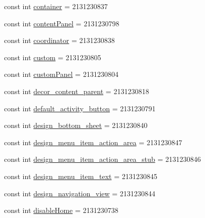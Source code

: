 \begin{DoxyCompactItemize}
const int \mbox{\hyperlink{class_f_w_p_s___app_1_1_droid_1_1_resource_1_1_id_a284b0cbba132e4f7505b5a28f7ec0555}{container}} = 2131230837
\item 
const int \mbox{\hyperlink{class_f_w_p_s___app_1_1_droid_1_1_resource_1_1_id_ab13653273251d59090e949d0c390664e}{content\+Panel}} = 2131230798
\item 
const int \mbox{\hyperlink{class_f_w_p_s___app_1_1_droid_1_1_resource_1_1_id_a62f37e7160ddc1a8037604f92c81b9f6}{coordinator}} = 2131230838
\item 
const int \mbox{\hyperlink{class_f_w_p_s___app_1_1_droid_1_1_resource_1_1_id_a1a0bb6d9199f62e452195f6d935f6916}{custom}} = 2131230805
\item 
const int \mbox{\hyperlink{class_f_w_p_s___app_1_1_droid_1_1_resource_1_1_id_a2867e3f3529f10602a168e7f28a9a16c}{custom\+Panel}} = 2131230804
\item 
const int \mbox{\hyperlink{class_f_w_p_s___app_1_1_droid_1_1_resource_1_1_id_a6f95d985b33c93529914dd80e72b5c8f}{decor\+\_\+content\+\_\+parent}} = 2131230818
\item 
const int \mbox{\hyperlink{class_f_w_p_s___app_1_1_droid_1_1_resource_1_1_id_a5368aeff13a14b51d915b4c19d327e9f}{default\+\_\+activity\+\_\+button}} = 2131230791
\item 
const int \mbox{\hyperlink{class_f_w_p_s___app_1_1_droid_1_1_resource_1_1_id_af2244a9f55be7fd623899ceb3058ba38}{design\+\_\+bottom\+\_\+sheet}} = 2131230840
\item 
const int \mbox{\hyperlink{class_f_w_p_s___app_1_1_droid_1_1_resource_1_1_id_a1846f651f77c6690d6157bb00ab19b38}{design\+\_\+menu\+\_\+item\+\_\+action\+\_\+area}} = 2131230847
\item 
const int \mbox{\hyperlink{class_f_w_p_s___app_1_1_droid_1_1_resource_1_1_id_af7c33f671559f34ba3af090b967ac3ed}{design\+\_\+menu\+\_\+item\+\_\+action\+\_\+area\+\_\+stub}} = 2131230846
\item 
const int \mbox{\hyperlink{class_f_w_p_s___app_1_1_droid_1_1_resource_1_1_id_ae0bb96f6903761151c41bb1238108960}{design\+\_\+menu\+\_\+item\+\_\+text}} = 2131230845
\item 
const int \mbox{\hyperlink{class_f_w_p_s___app_1_1_droid_1_1_resource_1_1_id_ab86c59c1e571bc6195467b269420b021}{design\+\_\+navigation\+\_\+view}} = 2131230844
\item 
const int \mbox{\hyperlink{class_f_w_p_s___app_1_1_droid_1_1_resource_1_1_id_ae152bc3a4c01750066975b9b1e8d0376}{disable\+Home}} = 2131230738
\item 

\end{DoxyCompactItemize}
